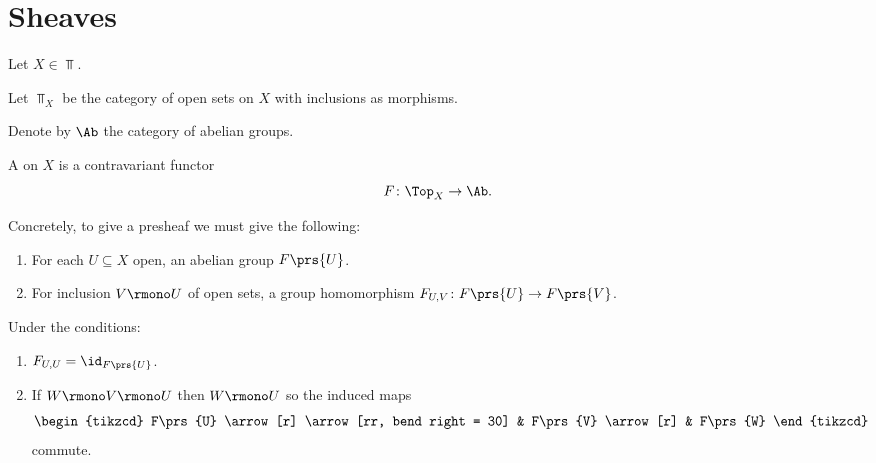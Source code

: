 \documentclass[10pt,a4paper,twoside,openany,hidelinks]{book}
\begin{document}
\chapter{Sheaves}

Let $X \in \Top$.

\begin{definition}
Let $\Top_X$ be the category of open sets on $X$ with inclusions as morphisms.
\end{definition}

\begin{notation}
Denote by $\Ab$ the category of abelian groups.
\end{notation}

\begin{definition}[Presheaf]
A  on $X$ is a contravariant functor
\[F \colon \Top_X \to \Ab \text{.}\]
\end{definition}

Concretely, to give a presheaf we must give the following:
\begin{enumerate}
\item For each $U \subseteq X$ open, an abelian group $F\prs{U}$.
\item For inclusion $V \rmono U$ of open sets, a group homomorphism $F_{U,V} \colon F\prs{U} \to F\prs{V}$.
\end{enumerate}
Under the conditions:
\begin{enumerate}
\item $F_{U,U} = \id_{F\prs{U}}$.
\item If $W \rmono V \rmono U$ then $W \rmono U$ so the induced maps
\[
\begin{tikzcd}
F\prs{U} \arrow[r] \arrow[rr, bend right = 30] & F\prs{V} \arrow[r] & F\prs{W}
\end{tikzcd}
\]
commute.
\end{enumerate}
\end{document}

